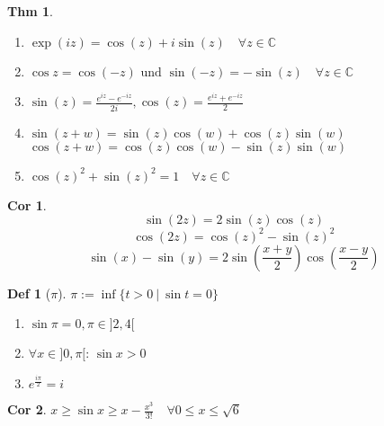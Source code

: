 \documentclass[a4paper, 10pt]{article}
\newtheorem*{corollary}{Cor}
\theoremstyle{definition}
\newtheorem*{theorem}{Thm}
\newtheorem*{definition}{Def}
\theoremstyle{named}
\newcommand{\C}{\mathbb{C}}
\begin{document}
\begin{theorem}
    \begin{enumerate}
        \item $\exp(iz) = \cos(z) +i\sin(z) \quad \forall z \in \C$
        \item $\cos z = \cos(-z) \text{ und } \sin(-z) = - \sin(z) \quad \forall z \in \C$
        \item $\sin(z) = \frac{e^{iz}-e^{-iz}}{2i}, \cos(z) = \frac{e^{iz}+e^{-iz}}{2}$
        \item $\sin(z+w) = \sin(z)\cos(w) + \cos(z)\sin(w)$ \\
            $\cos(z+w) = \cos(z)\cos(w) - \sin(z)\sin(w)$
        \item $\cos(z)^2+\sin(z)^2 = 1 \quad \forall z \in \mathbb{C}$
    \end{enumerate}
\end{theorem}

\begin{corollary}
    $$\sin(2z) = 2 \sin(z)\cos(z)$$
    $$\cos(2z) = \cos(z)^2 - \sin(z)^2$$
    $$\sin(x) - \sin(y) = 2 \sin\left(\frac{x + y}{2}\right)\cos\left(\frac{x - y}{2}\right)$$
\end{corollary}

\begin{definition}[$\pi$]
    $\pi := \inf \{ t > 0 \ | \ \sin t = 0\}$
    \begin{enumerate}[label=(\roman*)]
        \item $\sin \pi = 0, \pi \in ]2, 4[$
        \item $\forall x \in ]0, \pi[$: $\sin x > 0$
        \item $e^{\frac{i \pi}{2}} = i$
    \end{enumerate}
\end{definition}

\begin{corollary}
    $x \geq \sin x \geq x - \frac{x^3}{3!} \quad \forall 0 \leq x \leq \sqrt{6}$
\end{corollary}
\end{document}
